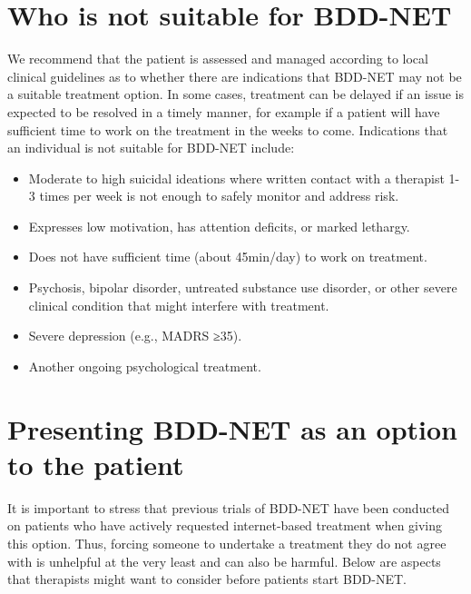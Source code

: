\documentclass[]{book}
\providecommand{\tightlist}{%
  \setlength{\itemsep}{0pt}\setlength{\parskip}{0pt}}
\begin{document}
\hypertarget{who-is-not-suitable-for-bdd-net}{%
\section{Who is not suitable for BDD-NET}\label{who-is-not-suitable-for-bdd-net}}

We recommend that the patient is assessed and managed according to local clinical guidelines as to whether there are indications that BDD-NET may not be a suitable treatment option. In some cases, treatment can be delayed if an issue is expected to be resolved in a timely manner, for example if a patient will have sufficient time to work on the treatment in the weeks to come. Indications that an individual is not suitable for BDD-NET include:

\begin{itemize}
\tightlist
\item
  Moderate to high suicidal ideations where written contact with a therapist 1-3 times per week is not enough to safely monitor and address risk.\\
\item
  Expresses low motivation, has attention deficits, or marked lethargy.\\
\item
  Does not have sufficient time (about 45min/day) to work on treatment.\\
\item
  Psychosis, bipolar disorder, untreated substance use disorder, or other severe clinical condition that might interfere with treatment.\\
\item
  Severe depression (e.g., MADRS ≥35).\\
\item
  Another ongoing psychological treatment.
\end{itemize}

\hypertarget{presenting-bdd-net-as-an-option-to-the-patient}{%
\section{Presenting BDD-NET as an option to the patient}\label{presenting-bdd-net-as-an-option-to-the-patient}}

It is important to stress that previous trials of BDD-NET have been conducted on patients who have actively requested internet-based treatment when giving this option. Thus, forcing someone to undertake a treatment they do not agree with is unhelpful at the very least and can also be harmful. Below are aspects that therapists might want to consider before patients start BDD-NET.
\end{document}
